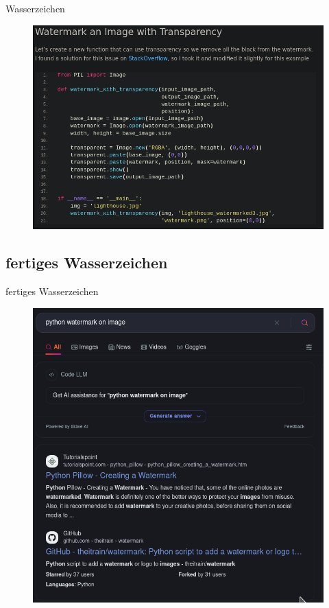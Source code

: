 \documentclass[a4paper,
	DIV=13,
	14pt,
	BCOR=10mm,
	department=FakEI,
	twoside,
	parskip=half,
	automark,
	aspectratio=169
]{beamer}
\begin{document}
\begin{frame}{Wasserzeichen}
	\begin{figure}[H]
		\includegraphics[height=0.8\textheight]{img/website2.png}
	\end{figure}
\end{frame}

\subsection{fertiges Wasserzeichen}
\begin{frame}{fertiges Wasserzeichen}
	\begin{figure}[H]
		\includegraphics[height=0.8\textheight]{img/first-search.png}
	\end{figure}
\end{frame}
\end{document}
